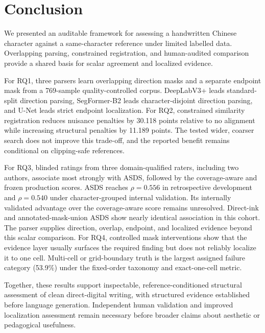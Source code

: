 \section{Conclusion}
\label{sec:conclusion}

We presented an auditable framework for assessing a handwritten Chinese
character against a same-character reference under limited labelled data.
Overlapping parsing, constrained registration, and human-audited comparison
provide a shared basis for scalar agreement and localized evidence.

For RQ1, three parsers learn overlapping direction masks and a separate
endpoint mask from a 769-sample quality-controlled corpus. DeepLabV3+ leads
standard-split direction parsing, SegFormer-B2 leads character-disjoint
direction parsing, and U-Net leads strict endpoint localization. For RQ2,
constrained similarity registration reduces nuisance penalties by 30.118
points relative to no alignment while increasing structural penalties by
11.189 points. The tested wider, coarser search does not improve this
trade-off, and the reported benefit remains conditional on clipping-safe
references.

For RQ3, blinded ratings from three domain-qualified raters, including two
authors, associate most strongly with ASDS, followed by the coverage-aware
and frozen production scores. ASDS reaches \(\rho=0.556\) in retrospective
development and \(\rho=0.540\) under character-grouped internal validation.
Its internally validated advantage over the coverage-aware score remains
unresolved. Direct-ink and annotated-mask-union ASDS show nearly identical
association in this cohort. The parser supplies direction, overlap,
endpoint, and localized evidence beyond this scalar comparison. For RQ4,
controlled mask interventions show that the evidence layer usually surfaces
the required finding but does not reliably localize it to one cell.
Multi-cell or grid-boundary truth is the largest assigned failure category
(53.9\%) under the fixed-order taxonomy and exact-one-cell metric.

Together, these results support inspectable, reference-conditioned
structural assessment of clean direct-digital writing, with structured
evidence established before language generation. Independent human
validation and improved localization assessment remain necessary before
broader claims about aesthetic or pedagogical usefulness.
